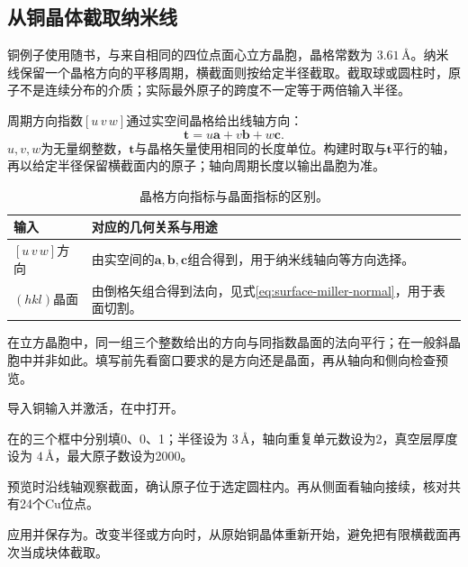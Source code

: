 \FloatBarrier
\subsection{从铜晶体截取纳米线}

铜例子使用随书，与来自相同的四位点面心立方晶胞，晶格常数为 $3.61\,\text{\AA}$。纳米线保留一个晶格方向的平移周期，横截面则按给定半径截取。截取球或圆柱时，原子不是连续分布的介质；实际最外原子的跨度不一定等于两倍输入半径。

周期方向指数$[u\,v\,w]$通过实空间晶格给出线轴方向：
\begin{equation}
  \mathbf t=u\mathbf a+v\mathbf b+w\mathbf c.
  \label{eq:nanowire-lattice-direction}
\end{equation}
$u,v,w$为无量纲整数，$\mathbf t$与晶格矢量使用相同的长度单位。构建时取与$\mathbf t$平行的轴，再以给定半径保留横截面内的原子；轴向周期长度以输出晶胞为准。

\begin{table}[htbp]
\centering
\caption{晶格方向指标与晶面指标的区别。}
\begin{tabularx}{\linewidth}{lX}
\toprule
输入 & 对应的几何关系与用途\\
\midrule
$[u\,v\,w]$方向 & 由实空间的$\mathbf a,\mathbf b,\mathbf c$组合得到，用于纳米线轴向等方向选择。\\
$(hkl)$晶面 & 由倒格矢组合得到法向，见式\eqref{eq:surface-miller-normal}，用于表面切割。\\
\bottomrule
\end{tabularx}
\end{table}

在立方晶胞中，同一组三个整数给出的方向与同指数晶面的法向平行；在一般斜晶胞中并非如此。填写前先看窗口要求的是方向还是晶面，再从轴向和侧向检查预览。

\begin{steps}
  \item 导入铜输入并激活，在中打开。
  \item 在的三个框中分别填0、0、1；半径设为 $3\,\text{\AA}$，轴向重复单元数设为2，真空层厚度设为 $4\,\text{\AA}$，最大原子数设为2000。
  \item 预览时沿线轴观察截面，确认原子位于选定圆柱内。再从侧面看轴向接续，核对共有24个Cu位点。
  \item 应用并保存为。改变半径或方向时，从原始铜晶体重新开始，避免把有限横截面再次当成块体截取。
\end{steps}

